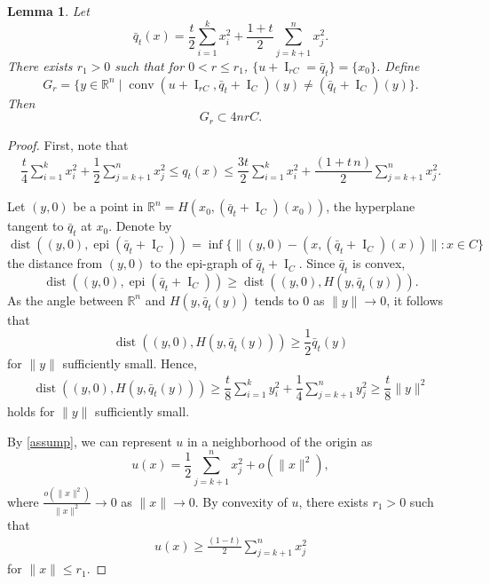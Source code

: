\documentclass[11pt]{article}
\newtheorem{lema}[teo]{Lemma}
\theoremstyle{definition} %
\DeclareMathOperator{\conv}{conv}
\DeclareMathOperator{\I}{I}
\DeclareMathOperator{\epi}{epi}
\DeclareMathOperator{\dist}{dist}
\begin{document}
\begin{lema}\label{claim3}
Let
\[
\bar{q}_t(x)=\frac{t}{2}\sum_{i=1}^k x_i^2
+\frac{1+t}{2}\sum_{j=k+1}^n x_j^2.
\]
There exists $r_1>0$ such that for $0<r\le r_1$,
$
\{u+\I_{rC} = \bar{q}_t\} = \{x_0\}
$.
Define
$$
G_r = \{y\in\mathbb{R}^n\mid  \conv(u+\I_{rC}, \bar{q}_t+\I_C)(y) \neq (\bar{q}_t+\I_C) (y)\}.
$$
Then
$$
G_r \subset  4 n rC.
$$    
\end{lema}


\begin{proof}
First, note that
\begin{align}\label{eq10.56}
  \dfrac{t}{4} \sum_{i=1}^k x_i^2 + \dfrac{1}{2} \sum_{j=k+1}^nx_j^2 \le q_t(x) \le \dfrac{3t}{2} \sum_{i=1}^k x_i^2 + \dfrac{(1+t\, n)}{2} \sum_{j=k+1}^nx_j^2.
\end{align}

Let $(y,0)$ be a point in $\mathbb{R}^n=H(x_0,(\bar{q}_t+ \I_C)(x_0))$, the 
 hyperplane tangent to $\bar{q}_t$ at $x_0$. Denote by
$$\dist((y,0), \epi (\bar{q}_t+ \I_C))= \inf\bigl\{\|(y,0)-(x,(\bar{q}_t+ \I_C)(x))\|:x\in C\bigr\}$$ 
the distance  from $(y,0)$ to the epi-graph of $\bar{q}_t+\I_C$.
Since $\bar{q}_t$ is  convex,
$$\dist((y,0), \epi (\bar{q}_t+ \I_C))\geq \dist((y,0), H(y,\bar{q}_t(y))).$$
As the angle between $\mathbb{R}^n$ and $H(y,\bar{q}_t(y))$ tends to $0$ as $\|y\|\to 0$, it follows that
$$\dist((y,0), H(y,\bar{q}_t(y))) \geq \frac{1}{2}\bar{q}_t(y)$$
for $\|y\|$ sufficiently small. Hence,
\begin{align}\label{eq10.57}
 \dist((y,0), H(y,\bar{q}_t(y)))  \geq    \dfrac{t}{8} \sum_{i=1}^k y_i^2 + \dfrac{1}{4} \sum_{j=k+1}^ny_j^2
 \geq \dfrac{t}{8}\|y\|^2
\end{align}
holds for $\|y\|$ sufficiently small.




By \eqref{assump},  we can represent $u$ in a neighborhood of the origin as
$$u(x) = \dfrac{1}{2}\sum_{j=k+1}^nx_j^2+ o(\|x\|^2),$$
where $\frac{o(\|x\|^2)}{\|x\|^2}\to 0$ as $\|x\|\to 0$. By convexity of $u$, there exists $r_1>0$ such that
\begin{align}\label{eq10.58}
    u(x)\geq \frac{(1-t)}{2}\sum_{j=k+1}^nx_j^2 
\end{align}
for $\|x\|\leq r_1$.



\end{proof}
\end{document}
